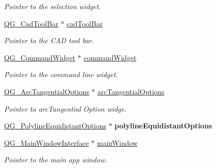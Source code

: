 \begin{DoxyCompactItemize}
\begin{DoxyCompactList}\small\item\em Pointer to the selection widget. \end{DoxyCompactList}\item 
\hypertarget{classQG__DialogFactory_aa3a89aa8d97a5d61a069077803476930}{\hyperlink{classQG__CadToolBar}{Q\-G\-\_\-\-Cad\-Tool\-Bar} $\ast$ \hyperlink{classQG__DialogFactory_aa3a89aa8d97a5d61a069077803476930}{cad\-Tool\-Bar}}\label{classQG__DialogFactory_aa3a89aa8d97a5d61a069077803476930}

\begin{DoxyCompactList}\small\item\em Pointer to the C\-A\-D tool bar. \end{DoxyCompactList}\item 
\hypertarget{classQG__DialogFactory_a83697cd33ad1a754d432f41fc325ae3e}{\hyperlink{classQG__CommandWidget}{Q\-G\-\_\-\-Command\-Widget} $\ast$ \hyperlink{classQG__DialogFactory_a83697cd33ad1a754d432f41fc325ae3e}{command\-Widget}}\label{classQG__DialogFactory_a83697cd33ad1a754d432f41fc325ae3e}

\begin{DoxyCompactList}\small\item\em Pointer to the command line widget. \end{DoxyCompactList}\item 
\hypertarget{classQG__DialogFactory_a847bc663dbcfcdabee605eeb51d49402}{\hyperlink{classQG__ArcTangentialOptions}{Q\-G\-\_\-\-Arc\-Tangential\-Options} $\ast$ \hyperlink{classQG__DialogFactory_a847bc663dbcfcdabee605eeb51d49402}{arc\-Tangential\-Options}}\label{classQG__DialogFactory_a847bc663dbcfcdabee605eeb51d49402}

\begin{DoxyCompactList}\small\item\em Pointer to arc\-Tangential Option widge. \end{DoxyCompactList}\item 
\hypertarget{classQG__DialogFactory_a8777bab1c52be73d5e674dca86d8ce9f}{\hyperlink{classQG__PolylineEquidistantOptions}{Q\-G\-\_\-\-Polyline\-Equidistant\-Options} $\ast$ {\bfseries polyline\-Equidistant\-Options}}\label{classQG__DialogFactory_a8777bab1c52be73d5e674dca86d8ce9f}

\item 
\hypertarget{classQG__DialogFactory_a8c737a45c27d094c920bf3f1f687f499}{\hyperlink{classQG__MainWindowInterface}{Q\-G\-\_\-\-Main\-Window\-Interface} $\ast$ \hyperlink{classQG__DialogFactory_a8c737a45c27d094c920bf3f1f687f499}{main\-Window}}\label{classQG__DialogFactory_a8c737a45c27d094c920bf3f1f687f499}

\begin{DoxyCompactList}\small\item\em Pointer to the main app window. \end{DoxyCompactList}\end{DoxyCompactItemize}


